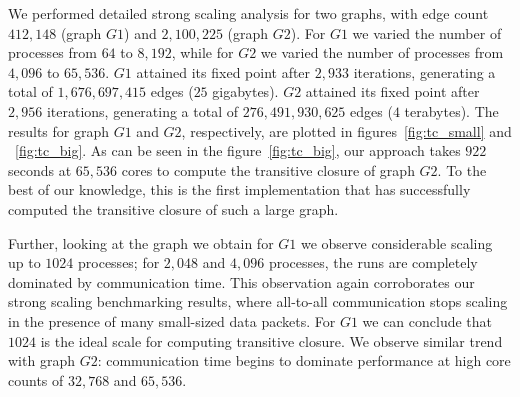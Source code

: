 We performed detailed strong scaling analysis for two graphs, with edge count $412,\!148$ (graph $G1$) and $2,\!100,\!225$ (graph $G2$).
For $G1$ we varied the number of processes from $64$ to $8,\!192$, while for $G2$ we varied the number of processes from $4,096$ to $65,\!536$. 
$G1$ attained its fixed point after $2,\!933$ iterations, generating a total of $1,\!676,\!697,\!415$ edges ($25$ gigabytes).
$G2$ attained its fixed point after $2,\!956$ iterations, generating a total of $276,\!491,\!930,\!625$ edges ($4$ terabytes).
The results for graph $G1$ and $G2$, respectively, are plotted in figures~\ref{fig:tc_small} and ~\ref{fig:tc_big}. As can be seen in the figure~\ref{fig:tc_big}, our approach takes $922$ seconds at $65,\!536$ cores to compute the transitive closure of graph $G2$. To the best of our knowledge, this is the first implementation that has successfully computed the transitive closure of such a large graph.

Further, looking at the graph we obtain for $G1$ we observe considerable scaling up to $1024$ processes; for $2,\!048$ and $4,\!096$ processes, the runs are completely dominated by communication time. This observation again corroborates our strong scaling benchmarking results, where all-to-all communication stops scaling in the presence of many small-sized data packets. For $G1$ we can conclude that $1024$ is the ideal scale for computing transitive closure.
We observe similar trend with graph $G2$: communication time begins to dominate performance at high core counts of $32,\!768$ and $65,\!536$. %





